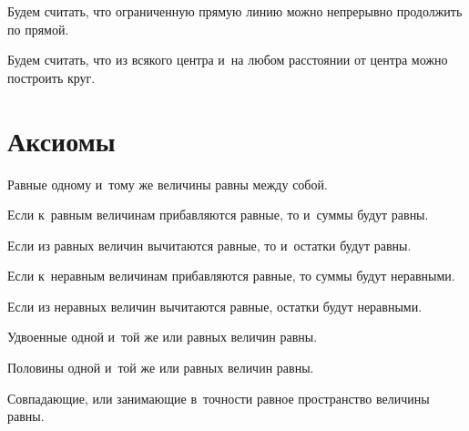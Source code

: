 \documentclass[letters,booklanguage=russian]{byrnebook}
\begin{document}
\startpostulate{}
\begin{center}
Будем считать, что ограниченную прямую линию можно непрерывно продолжить по прямой.
\end{center}

\startpostulate{}
\begin{center}
Будем считать, что из всякого центра и~на любом расстоянии от центра можно построить круг.
\end{center}

\vfill\pagebreak

\chapter*{Аксиомы}

\startaxiom{}
\begin{center}
Равные одному и~тому же величины равны между собой.
\end{center}

\startaxiom{}
\begin{center}
Если к~равным величинам прибавляются равные, то и~суммы будут равны.
\end{center}

\startaxiom{}
\begin{center}
Если из равных величин вычитаются равные, то и~остатки будут равны.
\end{center}

\startaxiom{}
\begin{center}
Если к~неравным величинам прибавляются равные, то суммы будут неравными.
\end{center}

\startaxiom{}
\begin{center}
Если из неравных величин вычитаются  равные, остатки будут неравными.
\end{center}

\startaxiom{}
\begin{center}
Удвоенные одной и~той же или равных величин равны.
\end{center}

\startaxiom{}
\begin{center}
Половины одной и~той же или равных величин равны.
\end{center}

\startaxiom{}
\begin{center}
Совпадающие, или занимающие в~точности равное пространство величины равны.
\end{center}
\end{document}
